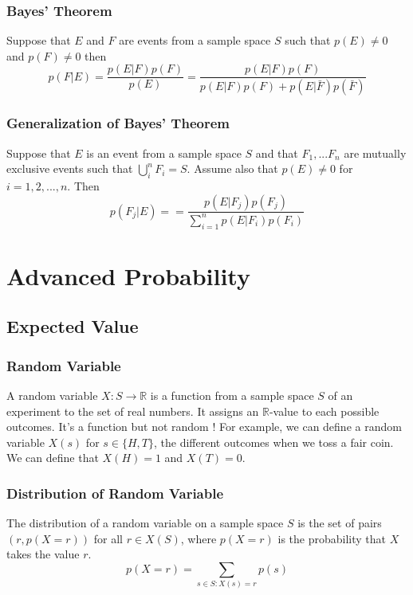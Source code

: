\documentclass{article}
\begin{document}
\subsubsection{Bayes' Theorem} Suppose that $ E $ and $ F $ are events from a sample space $ S $ such that $ p(E) \neq 0 $ and $ p(F) \neq 0 $ then
\begin{equation}
p(F | E) = \frac{p(E | F)p(F)}{p(E)} = \frac{p(E | F)p(F)}{p(E | F)p(F) + p(E | \bar{F})p(\bar{F})}
\end{equation}

\subsubsection{Generalization of Bayes' Theorem} Suppose that $ E $ is an event from a sample space $ S $ and that $ F_1,...F_n $ are mutually exclusive events such that $ \bigcup\limits_{i}^n F_i = S $. Assume also that $ p(E) \neq 0 $ for $ i = 1,2,...,n $. Then
\begin{equation}
p(F_j | E) = = \frac{p(E | F_j)p(F_j)}{\sum_{i=1}^{n} p(E | F_i)p(F_i)}
\end{equation}

\newpage
\section{Advanced Probability}
\subsection{Expected Value}
\subsubsection{Random Variable} A random variable $ X: S \rightarrow \mathbb{R} $ is a function from a sample space $ S $ of an experiment to the set of real numbers. It assigns an $ \mathbb{R} $-value to each possible outcomes. It's a function but not random ! For example, we can define a random variable $ X(s) $ for $ s \in \{H,T\} $, the different outcomes when we toss a fair coin. We can define that $ X(H) = 1 $ and $ X(T) = 0 $.

\subsubsection{Distribution of Random Variable} The distribution of a random variable on a sample space $ S $ is the set of pairs $ (r, p(X = r)) $ for all $ r \in X(S) $, where $ p(X = r) $ is the probability that $ X $ takes the value $ r $.
\begin{equation}
p(X = r) = \sum_{s \in S: X(s) = r} p(s)
\end{equation}
\end{document}
